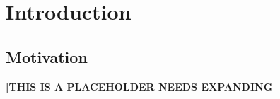 \documentclass{l4proj}
\begin{document}
\educationalconsent

\tableofcontents

%
%
%
%
%
%
%
%
\chapter{Introduction}



\section{Motivation}

\textbf{[THIS IS A PLACEHOLDER NEEDS EXPANDING]}
\end{document}
